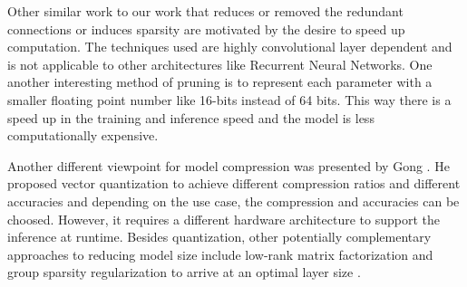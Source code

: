 Other similar work \cite{DBLP:journals/corr/AnwarHS15, DBLP:journals/corr/LebedevGROL14, DBLP:journals/corr/ChangpinyoSZ17} to our work that reduces or removed the redundant connections or induces sparsity are motivated by the desire to speed up computation.
The techniques used are highly convolutional layer dependent and is not applicable to other architectures like Recurrent Neural Networks. 
One another interesting method of pruning is to represent each parameter with a smaller floating point number like 16-bits instead of 64 bits. This way there is a speed up in the training and inference speed and the model is less computationally expensive. 

Another different viewpoint for model compression was presented by Gong \cite{DBLP:journals/corr/GongLYB14}. He proposed vector quantization to achieve different compression ratios and different accuracies and depending on the use case, the compression and accuracies can be choosed. However, it requires a different hardware architecture to support the inference at runtime. Besides quantization, other potentially complementary approaches to reducing model size include low-rank matrix factorization \cite{denton2014exploiting, DBLP:journals/corr/LebedevGROL14} and group sparsity regularization to arrive at an optimal layer size \cite{DBLP:conf/nips/AlvarezS16}.

